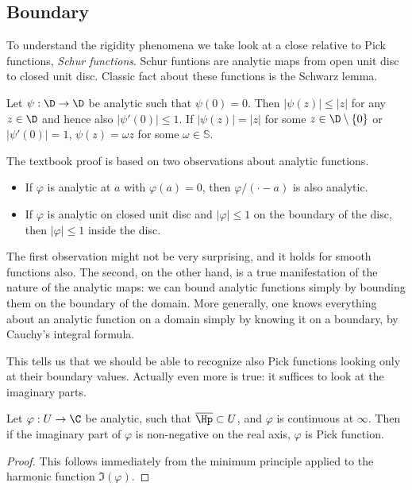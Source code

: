 \subsection{Boundary}

To understand the rigidity phenomena we take look at a close relative to Pick functions, \textit{Schur functions}. Schur funtions are analytic maps from open unit disc to closed unit disc. Classic fact about these functions is the Schwarz lemma.

\begin{lause}
	Let $\psi : \D \to \D$ be analytic such that $\psi(0) = 0$. Then $|\psi(z)| \leq |z|$ for any $z \in \D$ and hence also $|\psi'(0)| \leq 1$. If $|\psi(z)| = |z|$ for some $z \in \D \setminus \{0\}$ or $|\psi'(0)| = 1$, $\psi(z) = \omega z$ for some $\omega \in \mathbb{S}$.
\end{lause}

The textbook proof is based on two observations about analytic functions.
\begin{itemize}
	\item If $\varphi$ is analytic at $a$ with $\varphi(a) = 0$, then $\varphi/(\cdot - a)$ is also analytic.
	\item If $\varphi$ is analytic on closed unit disc and $|\varphi| \leq 1$ on the boundary of the disc, then $|\varphi| \leq 1$ inside the disc.
\end{itemize}

The first observation might not be very surprising, and it holds for smooth functions also. The second, on the other hand, is a true manifestation of the nature of the analytic maps: we can bound analytic functions simply by bounding them on the boundary of the domain. More generally, one knows everything about an analytic function on a domain simply by knowing it on a boundary, by Cauchy's integral formula.

This tells us that we should be able to recognize also Pick functions looking only at their boundary values. Actually even more is true: it suffices to look at the imaginary parts.

\begin{prop}
	Let $\varphi : U \to \C$ be analytic, such that $\overline{\Hp} \subset U$, and $\varphi$ is continuous at $\infty$. Then if the imaginary part of $\varphi$ is non-negative on the real axis, $\varphi$ is Pick function.
\end{prop}
\begin{proof}
	This follows immediately from the minimum principle applied to the harmonic function $\Im(\varphi)$.
\end{proof}

